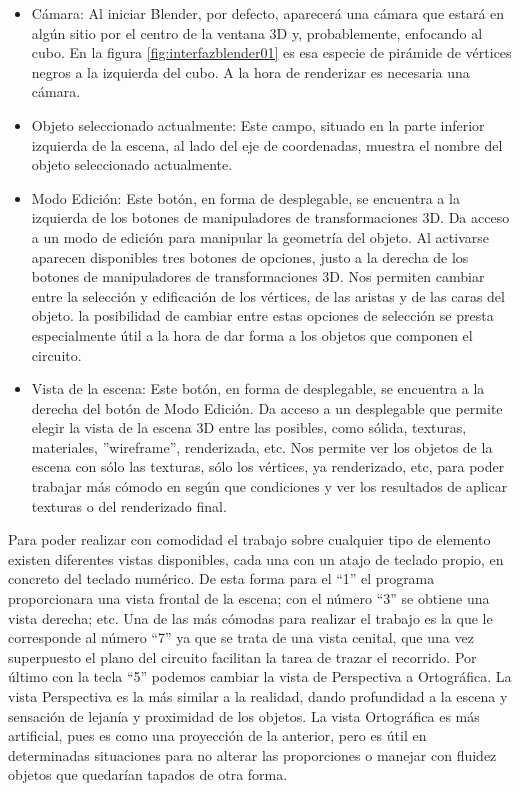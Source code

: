 \begin{itemize}
	\item Cámara: Al iniciar Blender, por defecto, aparecerá una cámara que estará en algún sitio por el centro de la ventana 3D y, probablemente, enfocando al cubo. En la figura \ref{fig:interfazblender01} es esa especie de pirámide de vértices negros a la izquierda del cubo. A la hora de renderizar es necesaria una cámara.
	
	\item Objeto seleccionado actualmente: Este campo, situado en la parte inferior izquierda de la escena, al lado del eje de coordenadas, muestra el  nombre del objeto seleccionado actualmente.
	
	\item Modo Edición: Este botón, en forma de desplegable, se encuentra a la izquierda de los botones de manipuladores de transformaciones 3D. Da acceso a un modo de edición para manipular la geometría del objeto. Al activarse aparecen disponibles tres botones de opciones, justo a la derecha de los botones de manipuladores de transformaciones 3D. Nos permiten cambiar entre la selección y edificación de los vértices, de las aristas y de las caras del objeto. la posibilidad de cambiar entre estas opciones de selección se presta especialmente útil a la hora de dar forma a los objetos que componen el circuito.
	
	\item Vista de la escena: Este botón, en forma de desplegable, se encuentra a la derecha del botón de Modo Edición. Da acceso a un desplegable que permite elegir la vista de la escena 3D entre las posibles, como sólida, texturas, materiales, ”wireframe”, renderizada, etc. Nos permite ver los objetos de la escena con sólo las texturas, sólo los vértices, ya renderizado, etc, para poder trabajar más cómodo en según que condiciones y ver los resultados de aplicar texturas o del renderizado final.
	
\end{itemize}

Para poder realizar con comodidad el trabajo sobre cualquier tipo de elemento existen diferentes vistas disponibles, cada una con un atajo de teclado propio, en concreto del teclado numérico. De esta forma para el “1” el programa proporcionara una vista frontal de la escena; con el número “3” se obtiene una vista derecha; etc. Una de las más cómodas para realizar el trabajo es la que le corresponde al número “7” ya que se trata de una vista cenital, que una vez superpuesto el plano del circuito facilitan la tarea de trazar el recorrido. Por último con la tecla “5” podemos cambiar la vista de Perspectiva a Ortográfica. La vista Perspectiva es la más similar a la realidad, dando profundidad a la escena y sensación de lejanía y proximidad de los objetos. La vista Ortográfica es más artificial, pues es como una proyección de la anterior, pero es útil en determinadas situaciones para no alterar las proporciones o manejar con fluidez objetos que quedarían tapados de otra forma.

